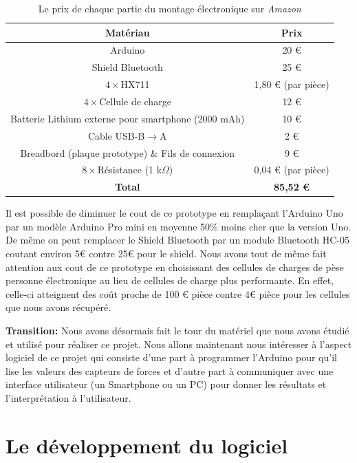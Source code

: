 \documentclass{polytech/polytech}
\begin{document}
\begin{table}
\begin{center}
\begin{tabular}{| c | c |}
\hline
\textbf{Matériau} & \textbf{Prix} \\\hline\hline
Arduino & 20 € \\\hline
Shield Bluetooth & 25 € \\\hline
$4 \times$HX711 & 1,80 € (par pièce) \\\hline
$4 \times$Cellule de charge & 12 € \\\hline
Batterie Lithium externe pour smartphone (2000 mAh) & 10 € \\\hline
Cable USB-B$\rightarrow$A & 2 € \\\hline
Breadbord (plaque prototype) \& Fils de connexion & 9 € \\\hline
$8 \times$Résistance (1 k$\Omega$) & 0,04 € (par pièce) \\\hline
\textbf{Total} &  \textbf{85,52 €} \\\hline
\end{tabular}
\end{center}
\caption{Le prix de chaque partie du montage électronique sur \textit{Amazon}}
\label{tab:prix_amazon}
\end{table}


Il est possible de diminuer le cout de ce prototype en remplaçant l'Arduino Uno par un modèle Arduino Pro mini en moyenne 50\% moins cher que la version Uno. De même on peut remplacer le Shield Bluetooth par un module Bluetooth HC-05 coutant environ 5€ contre 25€ pour le shield.
Nous avons tout de même fait attention aux cout de ce prototype en choisissant des cellules de charges de pèse personne électronique au lieu de cellules de charge plus performante.
 En effet, celle-ci atteignent des coût proche de 100 € pièce contre 4€ pièce pour les cellules que nous avons récupéré.

\textbf{Transition:} Nous avons désormais fait le tour du matériel que nous avons étudié et utilisé pour réaliser ce projet. Nous allons maintenant nous intéresser à l'aspect logiciel de ce projet qui consiste d'une part à programmer l'Arduino pour qu'il lise les valeurs des capteurs de forces et d'autre part à communiquer avec une interface utilisateur (un Smartphone ou un PC) pour donner les résultats et l'interprétation à l'utilisateur.


\chapter{Le développement du logiciel}
\label{chap:logiciel}
\end{document}
